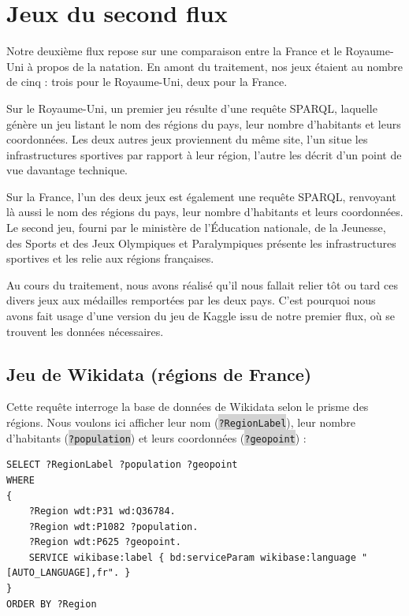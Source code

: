 \documentclass[hidelinks, 12pt]{report}
\newcommand{\code}[1]{\colorbox{LightGray}{\texttt{#1}}}
\begin{document}
\section{Jeux du second flux}

Notre deuxième flux repose sur une comparaison entre la France et le Royaume-Uni à propos de la natation. En amont du traitement, nos jeux étaient au nombre de cinq : trois pour le Royaume-Uni, deux pour la France.

Sur le Royaume-Uni, un premier jeu résulte d'une requête SPARQL, laquelle génère un jeu listant le nom des régions du pays, leur nombre d'habitants et leurs coordonnées\autocite{wikiqueryeng}. Les deux autres jeux proviennent du même site\autocite{ru}, l'un situe les infrastructures sportives par rapport à leur région, l'autre les décrit d'un point de vue davantage technique.

Sur la France, l'un des deux jeux est également une requête SPARQL, renvoyant là aussi le nom des régions du pays, leur nombre d'habitants et leurs coordonnées\autocite{wikiqueryfr}. Le second jeu, fourni par le ministère de l'Éducation nationale, de la Jeunesse, des Sports et des Jeux Olympiques et Paralympiques\autocite{ministere} présente les infrastructures sportives et les relie aux régions françaises.

Au cours du traitement, nous avons réalisé qu'il nous fallait relier tôt ou tard ces divers jeux aux médailles remportées par les deux pays. C'est pourquoi nous avons fait usage d'une version du jeu de Kaggle issu de notre premier flux, où se trouvent les données nécessaires.





%





\subsection{Jeu de Wikidata (régions de France)}

\label{queryfr}Cette requête interroge la base de données de Wikidata selon le prisme des régions. Nous voulons ici afficher leur nom (\code{?RegionLabel}), leur nombre d'habitants (\code{?population}) et leurs coordonnées (\code{?geopoint}) :

\begin{lstlisting}[language=SPARQL]
SELECT ?RegionLabel ?population ?geopoint
WHERE 
{
	?Region wdt:P31 wd:Q36784.
	?Region wdt:P1082 ?population.
	?Region wdt:P625 ?geopoint.
	SERVICE wikibase:label { bd:serviceParam wikibase:language "[AUTO_LANGUAGE],fr". }
}
ORDER BY ?Region
\end{lstlisting}
\end{document}
